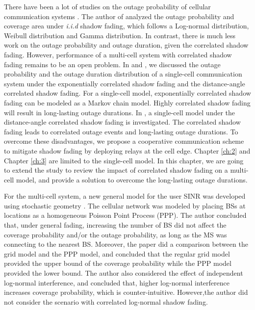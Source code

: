  \par There have been a lot of studies on the outage probability of cellular communication systems \cite{abu1991outage, petrovic2013outage, emamian2014outage}. The author of \cite{vural2015effect} analyzed the outage probability and coverage area under \emph{i.i.d} shadow fading, which follows a Log-normal distribution, Weibull distribution and Gamma distribution. In contrast, there is much less work on the outage probability and outage duration, given the correlated shadow fading. However, performance of a multi-cell system with correlated shadow fading remains to be an open problem. In \cite{lu2015long} and \cite{lu2015shining}, we discussed the outage probability and the outage duration distribution of a single-cell communication system under the exponentially correlated shadow fading and the distance-angle correlated shadow fading. For a single-cell model, exponentially correlated shadow fading can be modeled as a Markov chain model. Highly correlated shadow fading will result in long-lasting outage durations. In \cite{lu2015shining}, a single-cell model under the distance-angle correlated shadow fading is investigated. The correlated shadow fading leads to correlated outage events and long-lasting outage durations. To overcome these disadvantages, we propose a cooperative communication scheme to mitigate shadow fading by deploying relays at the cell edge. Chapter \ref{ch:2} and Chapter \ref{ch:3} are limited to the single-cell model. In this chapter, we are going to extend the study to review the impact of correlated shadow fading on a multi-cell model, and provide a solution to overcome the long-lasting outage durations.
 
 
 
 \par For the multi-cell system, a new general model for the user SINR was developed using stochastic geometry \cite{andrews2011tractable}. The cellular network was modeled by placing BSs at locations as a homogeneous Poisson Point Process (PPP). The author concluded that, under general fading, increasing the number of BS did not affect the coverage probability and/or the outage probability, as long as the MS was connecting to the nearest BS. Moreover, the paper did a comparison between the grid model and the PPP model, and concluded that the regular grid model provided the upper bound of the coverage probability while the PPP model provided the lower bound. The author also considered the effect of independent log-normal interference, and concluded that, higher log-normal interference increases coverage probability, which is counter-intuitive. However,the author did not consider the scenario with correlated log-normal shadow fading. 
 
